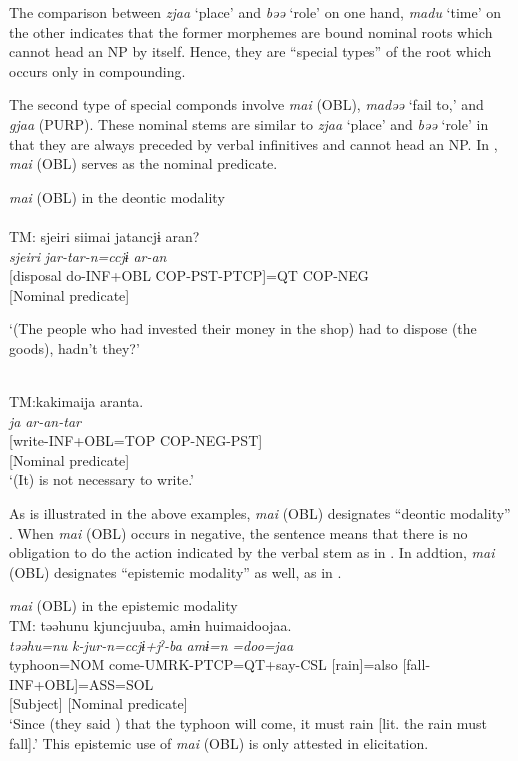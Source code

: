 \begin{exe}
\begin{xlist}
\noindent The comparison between \textit{zjaa} ‘place’ and \textit{bəə} ‘role’ on one hand, \textit{madu} ‘time’ on the other indicates that the former morphemes are bound nominal roots which cannot head an NP by itself. Hence, they are “special types” of the root which occurs only in compounding.

The second type of special componds involve \textit{mai} (OBL), \textit{madəə} ‘fail to,’ and \textit{gjaa} (PURP). These nominal stems are similar to \textit{zjaa} ‘place’ and \textit{bəə} ‘role’ in that they are always preceded by verbal infinitives and cannot head an NP. In , \textit{mai} (OBL) serves as the nominal predicate. 

\ea\label{ex:4.31}
\textit{mai} (OBL) in the deontic modality\\
\ea {}\label{ex:4.31a}\\
 {TM:} \gllll {\textbar}sjeiri{\textbar} {siimai} {jatancjɨ} {aran?}\\
  {\itshape sjeiri}  {\itshape jar-tar-n=ccjɨ} {\itshape ar-an}\\
  {[disposal {do-INF+OBL}} {COP-PST-PTCP]=QT} {COP-NEG}\\
  {[Nominal predicate]} \\
  \glt{}\parbox{\linewidth - \widthof{TM:}}{‘(The people who had invested their money in the shop) had to dispose (the goods), hadn’t they?’}
\ex\relax [El: 111105]\\\label{ex:4.31b}
TM:\gllll kakimaija {aranta.}\\
  \textit{ja} {\itshape ar-an-tar}\\
  {[write-INF+OBL=TOP} {COP-NEG-PST]}\\
  {[Nominal predicate]}\\
  \glt{} ‘(It) is not necessary to write.’
\z
\z

\noindent As is illustrated in the above examples, \textit{mai} (OBL) designates “deontic modality” \citep[823]{Lyons1977}. When \textit{mai} (OBL) occurs in negative, the sentence means that there is no obligation to do the action indicated by the verbal stem as in . In addtion, \textit{mai} (OBL) designates “epistemic modality” \citep[793--809]{Lyons1977} as well, as in .

\ea \label{ex:4.32}\textit{mai} (OBL) in the epistemic modality\hfill\relax[El: 120929]\\
TM: \gllll təəhunu {kjuncjuuba,} {amɨn} {huimaidoojaa.}\\
 {\itshape təəhu=nu} {\itshape k-jur-n=ccjɨ+jˀ-ba} {\itshape amɨ=n} \textit{=doo=jaa}\\
 {typhoon=NOM} {come-UMRK-PTCP=QT+say-CSL} {[rain]=also} {[fall-INF+OBL]=ASS=SOL}\\
  {} {} {[Subject]}  {[Nominal predicate]}\\
\glt{} ‘Since (they said ) that the typhoon will come, it must rain [lit. the rain must fall].’
\z
\noindent This epistemic use of \textit{mai} (OBL) is only attested in elicitation.


\end{xlist}
\end{exe}
